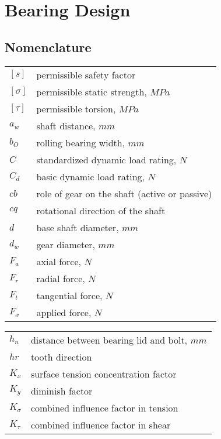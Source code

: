 \chapter{Bearing Design}
\section{Nomenclature}
\begin{tabular}[t]{lp{6.5cm}}
	$ [s] $ & permissible safety factor\\
	$ [\sigma] $ & permissible static strength, $ \unit{MPa} $\\
	$ [\tau] $ & permissible torsion, $ \unit{MPa} $\\
	$ a_w $ & shaft distance, $ \unit{mm} $\\
	$ b_O $ & rolling bearing width, $ \unit{mm}$\\
	$ C $ & standardized dynamic load rating, $ \unit{N} $\\
	$ C_d $ & basic dynamic load rating, $ \unit{N} $\\
	$ cb $ & role of gear on the shaft (active or passive)\\
	$ cq $ & rotational direction of the shaft\\
	$ d $ & base shaft diameter, $ \unit{mm} $\\
	$ d_w $ & gear diameter, $ \unit{mm} $\\
	$ F_a $ & axial force, $ \unit{N} $\\
	$ F_r $ & radial force, $ \unit{N} $\\
	$ F_t $ & tangential force, $ \unit{N} $\\
	$ F_x $ & applied force, $ \unit{N} $\\	
\end{tabular}
\begin{tabular}[t]{lp{6.5cm}}
	$ h_n $ & distance between bearing lid and bolt, $ \unit{mm} $\\
	$ hr $ & tooth direction\\
	$ K_x $ & surface tension concentration factor\\
	$ K_y $ & diminish factor\\
	$ K_\sigma $ & combined influence factor in tension\\
	$ K_\tau $ & combined influence factor in shear\\
\end{tabular}\newpage
